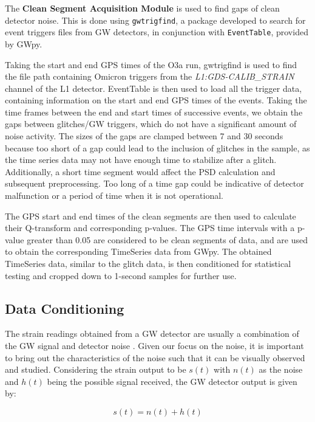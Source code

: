\documentclass[12pt]{article}
\begin{document}
\noindent The \textbf{Clean Segment Acquisition Module} is used to find gaps of clean detector noise. This is done using \texttt{gwtrigfind}, a package developed to search for event triggers files from GW detectors, in conjunction with \texttt{EventTable}, provided by GWpy.

\medskip
\noindent Taking the start and end GPS times of the O3a run, gwtrigfind is used to find the file path containing Omicron triggers from the \textit{L1:GDS-CALIB\_STRAIN} channel of the L1 detector. EventTable is then used to load all the trigger data, containing information on the start and end GPS times of the events. Taking the time frames between the end and start times of successive events, we obtain the gaps between glitches/GW triggers, which do not have a significant amount of noise activity. The sizes of the gaps are clamped between 7 and 30 seconds because too short of a gap could lead to the inclusion of glitches in the sample, as the time series data may not have enough time to stabilize after a glitch. Additionally, a short time segment would affect the PSD calculation and subsequent preprocessing. Too long of a time gap could be indicative of detector malfunction or a period of time when it is not operational.

\medskip
\noindent The GPS start and end times of the clean segments are then used to calculate their Q-transform and corresponding p-values. The GPS time intervals with a p-value greater than 0.05 are considered to be clean segments of data, and are used to obtain the corresponding TimeSeries data from GWpy. The obtained TimeSeries data, similar to the glitch data, is then conditioned for statistical testing and cropped down to 1-second samples for further use.

\subsection{Data Conditioning}\label{DataConditioning}

\noindent The strain readings obtained from a GW detector are usually a combination of the GW signal and detector noise \cite{cutler_gravitational_1994, moore_gravitational-wave_2015, Li:2013lza}. Given our focus on the noise, it is important to bring out the characteristics of the noise such that it can be visually observed and studied. Considering the strain output to be $s(t)$ with $n(t)$ as the noise and $h(t)$ being the possible signal received, the GW detector output is given by:

\begin{equation}
    s(t) = n(t) + h(t)
    \label{eq:strain_output}
\end{equation}
\end{document}
